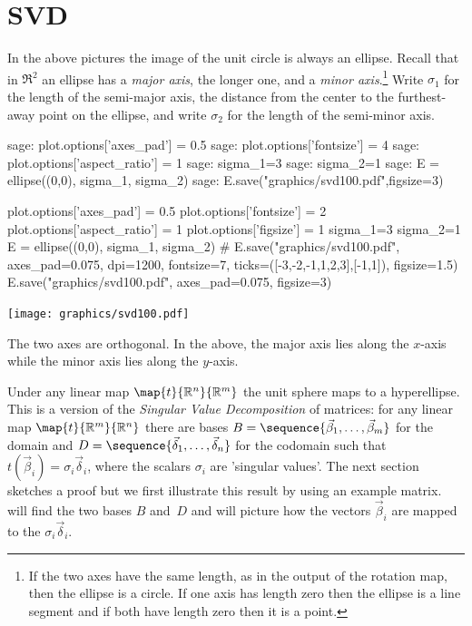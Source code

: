 \section{SVD}
In the above pictures the image of the unit circle is always an ellipse.
Recall that in $\Re^2$ an ellipse has a \textit{major axis}, 
the longer one, and a 
\textit{minor axis}.\footnote{If the two axes have the same length,
as in the output of the rotation map, 
then the ellipse is a circle.
If one axis has length zero then the ellipse is a line segment 
and if both have length zero then it is a point.}
Write $\sigma_1$ for the length of the semi-major axis, 
the distance from the center to the furthest-away point on the ellipse,
and write $\sigma_2$ for the length of the semi-minor axis.
\begin{sagecommandline}
sage: plot.options['axes_pad'] = 0.5
sage: plot.options['fontsize'] = 4
sage: plot.options['aspect_ratio'] = 1
sage: sigma_1=3
sage: sigma_2=1
sage: E = ellipse((0,0), sigma_1, sigma_2)
sage: E.save("graphics/svd100.pdf",figsize=3)
\end{sagecommandline}
\begin{sagesilent}
plot.options['axes_pad'] = 0.5
plot.options['fontsize'] = 2
plot.options['aspect_ratio'] = 1
plot.options['figsize'] = 1
sigma_1=3
sigma_2=1
E = ellipse((0,0), sigma_1, sigma_2)
# E.save("graphics/svd100.pdf", axes_pad=0.075, dpi=1200, fontsize=7, ticks=([-3,-2,-1,1,2,3],[-1,1]), figsize=1.5)
E.save("graphics/svd100.pdf", axes_pad=0.075, figsize=3)
\end{sagesilent}
\begin{center}
  \texttt{[image: graphics/svd100.pdf]}
\end{center}
The two axes are orthogonal.
In the above, the major axis lies along the $x$-axis while the
minor axis lies along the $y$-axis.

Under any linear map $\map{t}{\Re^n}{\Re^m}$ the 
unit sphere maps to a hyperellipse.
This is a version of the \textit{Singular Value Decomposition} of
matrices:
for any linear map $\map{t}{\Re^m}{\Re^n}$ there are bases
$B=\sequence{\vec{\beta}_1,\ldots,\vec{\beta}_m}$ for the domain and
$D=\sequence{\vec{\delta}_1,\ldots,\vec{\delta}_n}$ for the codomain
such that $t(\vec{\beta}_i)=\sigma_i\vec{\delta}_i$, where the
scalars $\sigma_i$ are 'singular values'.
The next section sketches a proof
but we first illustrate this result by using an example matrix.
\Sage{} will find the two bases $B$ and~$D$ and will picture how the 
vectors $\vec{\beta}_i$ 
are mapped to the $\sigma_i\vec{\delta}_i$.

